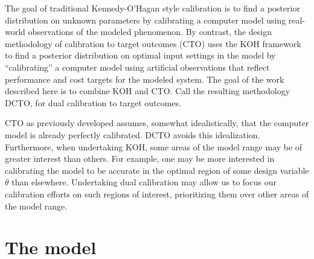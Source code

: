 \documentclass[12pt]{article}
\begin{document}
%
The goal of traditional Kennedy-O'Hagan style calibration \citep[KOH, ][]{kennedy2001} is to find a posterior distribution on unknown parameters by calibrating a computer model using real-world observations of the modeled phenomenon.
%
By contrast, the design methodology of calibration to target outcomes (CTO) uses the KOH framework to find a posterior distribution on optimal input settings in the model by ``calibrating'' a computer model using artificial observations that reflect performance and cost targets for the modeled system.
%
The goal of the work described here is to combine KOH and CTO.
%
Call the resulting methodology DCTO, for dual calibration to target outcomes.

CTO as previously developed assumes, somewhat idealistically, that the computer model is already perfectly calibrated.
%
DCTO avoids this idealization.
%
Furthermore, when undertaking KOH, some areas of the model range may be of greater interest than others.
%
For example, one may be more interested in calibrating the model to be accurate in the optimal region of some design variable $\theta$ than elsewhere.
%
Undertaking dual calibration may allow us to focus our calibration efforts on such regions of interest, prioritizing them over other areas of the model range.
%

\section{The model}
\end{document}
